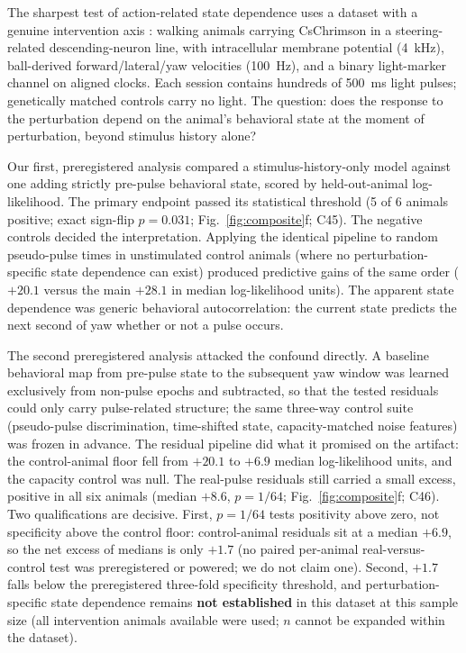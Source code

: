 \documentclass[pdflatex,sn-nature]{sn-jnl}
\begin{document}
The sharpest test of action-related state dependence uses a dataset with a genuine intervention axis \cite{rayshubskiy2025neural}: walking animals carrying CsChrimson in a steering-related descending-neuron line, with intracellular membrane potential (4~kHz), ball-derived forward/lateral/yaw velocities (100~Hz), and a binary light-marker channel on aligned clocks. Each session contains hundreds of 500~ms light pulses; genetically matched controls carry no light. The question: does the response to the perturbation depend on the animal's behavioral state at the moment of perturbation, beyond stimulus history alone?

Our first, preregistered analysis compared a stimulus-history-only model against one adding strictly pre-pulse behavioral state, scored by held-out-animal log-likelihood. The primary endpoint passed its statistical threshold (5 of 6 animals positive; exact sign-flip $p=0.031$; Fig.~\ref{fig:composite}f; C45). The negative controls decided the interpretation. Applying the identical pipeline to random pseudo-pulse times in unstimulated control animals (where no perturbation-specific state dependence can exist) produced predictive gains of the same order ($+20.1$ versus the main $+28.1$ in median log-likelihood units). The apparent state dependence was generic behavioral autocorrelation: the current state predicts the next second of yaw whether or not a pulse occurs.

The second preregistered analysis attacked the confound directly. A baseline behavioral map from pre-pulse state to the subsequent yaw window was learned exclusively from non-pulse epochs and subtracted, so that the tested residuals could only carry pulse-related structure; the same three-way control suite (pseudo-pulse discrimination, time-shifted state, capacity-matched noise features) was frozen in advance. The residual pipeline did what it promised on the artifact: the control-animal floor fell from $+20.1$ to $+6.9$ median log-likelihood units, and the capacity control was null. The real-pulse residuals still carried a small excess, positive in all six animals (median $+8.6$, $p=1/64$; Fig.~\ref{fig:composite}f; C46). Two qualifications are decisive. First, $p=1/64$ tests positivity above zero, not specificity above the control floor: control-animal residuals sit at a median $+6.9$, so the net excess of medians is only $+1.7$ (no paired per-animal real-versus-control test was preregistered or powered; we do not claim one). Second, $+1.7$ falls below the preregistered three-fold specificity threshold, and perturbation-specific state dependence remains \textbf{not established} in this dataset at this sample size (all intervention animals available were used; $n$ cannot be expanded within the dataset).
\end{document}
